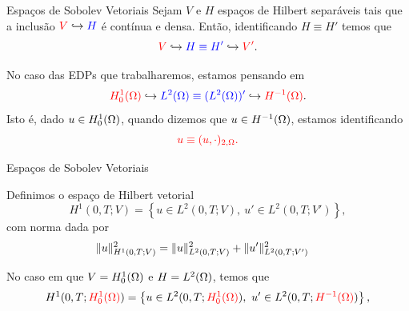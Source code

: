 \begin{frame}{Espaços de Sobolev Vetoriais}
Sejam {\color{red}\(V\)} e {\color{blue}\(H\)}  espaços de Hilbert separáveis tais que a inclusão
 \({\color{red}V}\hookrightarrow {\color{blue}H}\) é contínua e densa. Então, identificando \(H\equiv H'\) temos que
 \[
 {\color{red}V}\hookrightarrow {\color{blue}H\equiv H'}\hookrightarrow {\color{red}V'}.
 \]

No caso das EDPs que trabalharemos, estamos pensando em 
\[
{\color{red}H_0^1(\Omega)}\hookrightarrow {\color{blue}L^2(\Omega)\equiv (L^2(\Omega))^\prime}\hookrightarrow {\color{red}H^{-1}(\Omega)}.
\]
Isto é, dado {\color{red}\(u\in H_0^1(\Omega)\)}, quando dizemos que {\color{red}\(u\in H^{-1}(\Omega)\)}, estamos identificando 
\[
{\color{red}u\equiv (u,\cdot)_{2,\Omega}.}
\]
\end{frame}
\begin{frame}{Espaços de Sobolev Vetoriais}

\begin{defin}
 Definimos o {\color{blue}espaço de Hilbert vetorial}
 \[
 H^{1}(0,T;V)=\left\{
 u\in L^2(0,T;V),\ u'\in L^{2}(0,T;V') 
  \right\},
 \]
com norma dada por
\begin{align*}
\lVert u\rVert_{H^{1}(0,T;V)}^2& =\lVert u\rVert_{L^2(0,T;V)}^2+\lVert u^\prime\rVert_{L^2(0,T;V')}^2
\end{align*}
\end{defin}

No caso em que {\color{red}\(V=H_0^1(\Omega)\)} e {\color{blue}\(H=L^2(\Omega)\)}, temos que 
 \[
 H^{1}(0,T;{\color{red}H_0^1(\Omega)})
 =\left\{
 u\in L^2(0,T;{\color{red}H_0^1(\Omega)}),\ u'\in L^{2}(0,T;{\color{red}H^{-1}(\Omega)}) 
  \right\},
 \]
\end{frame}
